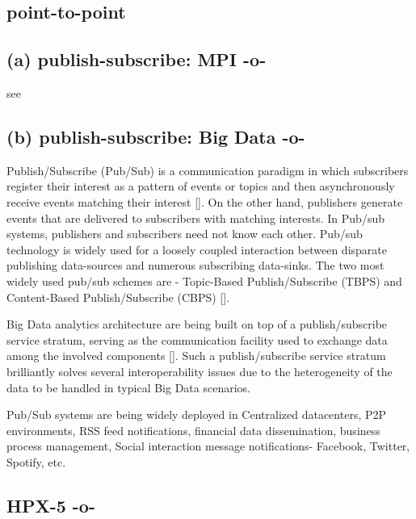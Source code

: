 \subsection{point-to-point}
\subsection{ (a) publish-subscribe: MPI -o-}

     see 
     
\subsection{ (b) publish-subscribe: Big Data -o-}

Publish/Subscribe (Pub/Sub) is a communication paradigm in which
subscribers register their interest as a pattern of events or topics
and then asynchronously receive events matching their
interest [\cite{thesis-pub-sub}].  On the other hand, publishers
generate events that are delivered to subscribers with matching
interests.  In Pub/sub systems, publishers and subscribers need not
know each other. Pub/sub technology is widely used for a loosely
coupled interaction between disparate publishing data-sources and
numerous subscribing data-sinks. The two most widely used pub/sub
schemes are - Topic-Based Publish/Subscribe (TBPS) and Content-Based
Publish/Subscribe (CBPS) [\cite{paper-pub-sub}].
      
Big Data analytics architecture are being built on top of a
publish/subscribe service stratum, serving as the communication
facility used to exchange data among the involved
components [\cite{paper-pub-sub-bigdata}]. Such a publish/subscribe
service stratum brilliantly solves several interoperability issues due
to the heterogeneity of the data to be handled in typical Big Data
scenarios.

     Pub/Sub systems are being widely deployed in Centralized
     datacenters, P2P environments, RSS feed notifications, financial
     data dissemination, business process management, Social
     interaction message notifications- Facebook, Twitter, Spotify,
     etc.



\subsection{HPX-5 -o-}

